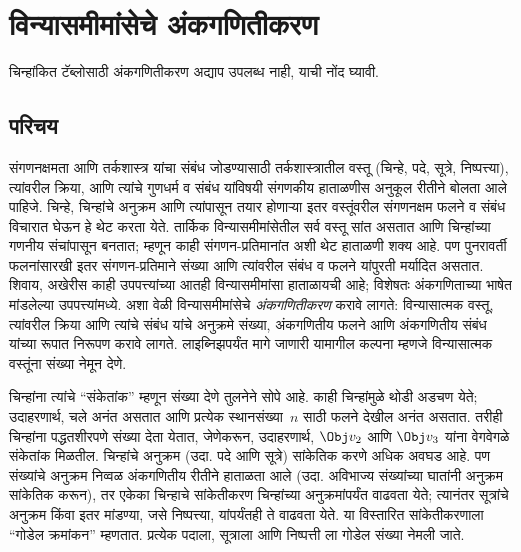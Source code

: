 \chapter{विन्यासमीमांसेचे अंकगणितीकरण}\label{inc:art::chap}
\begin{editorial}
  चिन्हांकित टॅब्लोसाठी अंकगणितीकरण अद्याप उपलब्ध नाही, याची नोंद घ्यावी.
\end{editorial}








\section{परिचय}\label{inc:art:int:sec}

संगणनक्षमता आणि तर्कशास्त्र यांचा संबंध जोडण्यासाठी तर्कशास्त्रातील
वस्तू (चिन्हे, पदे, सूत्रे, निष्पत्त्या), त्यांवरील क्रिया,
आणि त्यांचे गुणधर्म व संबंध यांविषयी संगणकीय हाताळणीस अनुकूल रीतीने
बोलता आले पाहिजे. चिन्हे, चिन्हांचे अनुक्रम आणि त्यांपासून तयार
होणाऱ्या इतर वस्तूंवरील संगणनक्षम फलने व संबंध विचारात घेऊन हे थेट
करता येते. तार्किक विन्यासमीमांसेतील सर्व वस्तू सांत असतात आणि
चिन्हांच्या गणनीय संचांपासून बनतात; म्हणून काही संगणन-प्रतिमानांत
अशी थेट हाताळणी शक्य आहे. पण पुनरावर्ती फलनांसारखी इतर संगणन-प्रतिमाने
संख्या आणि त्यांवरील संबंध व फलने यांपुरती मर्यादित असतात. शिवाय,
अखेरीस काही उपपत्त्यांच्या आतही विन्यासमीमांसा हाताळायची आहे;
विशेषतः अंकगणिताच्या भाषेत मांडलेल्या उपपत्त्यांमध्ये. अशा वेळी
विन्यासमीमांसेचे \emph{अंकगणितीकरण} करावे लागते: विन्यासात्मक वस्तू,
त्यांवरील क्रिया आणि त्यांचे संबंध यांचे अनुक्रमे संख्या, अंकगणितीय
फलने आणि अंकगणितीय संबंध यांच्या रूपात निरूपण करावे लागते. लाइब्निझपर्यंत
मागे जाणारी यामागील कल्पना म्हणजे विन्यासात्मक वस्तूंना संख्या नेमून देणे.

चिन्हांना त्यांचे ``संकेतांक'' म्हणून संख्या देणे तुलनेने सोपे आहे.
काही चिन्हांमुळे थोडी अडचण येते; उदाहरणार्थ, चले अनंत असतात
आणि प्रत्येक स्थानसंख्या~$n$ साठी फलने देखील अनंत असतात.
तरीही चिन्हांना पद्धतशीरपणे संख्या देता येतात, जेणेकरून, उदाहरणार्थ,
$\Obj v_2$ आणि $\Obj v_3$ यांना वेगवेगळे संकेतांक मिळतील. चिन्हांचे
अनुक्रम (उदा. पदे आणि सूत्रे) सांकेतिक करणे अधिक अवघड आहे.
पण संख्यांचे अनुक्रम निव्वळ अंकगणितीय रीतीने हाताळता आले (उदा.
अविभाज्य संख्यांच्या घातांनी अनुक्रम सांकेतिक करून), तर एकेका चिन्हाचे
सांकेतीकरण चिन्हांच्या अनुक्रमांपर्यंत वाढवता येते; त्यानंतर
सूत्रांचे अनुक्रम किंवा इतर मांडण्या, जसे निष्पत्त्या,
यांपर्यंतही ते वाढवता येते. या विस्तारित सांकेतीकरणाला ``गोडेल
क्रमांकन'' म्हणतात. प्रत्येक पदाला, सूत्राला आणि
निष्पत्ती ला गोडेल संख्या नेमली जाते.

